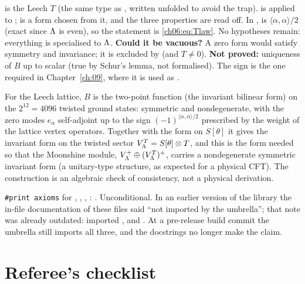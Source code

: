 \begin{dictionary}
 is the Leech $T$ (the same type as , written unfolded to avoid the
 trap).   is  applied to
;  is a form chosen from it, and the three properties are read
off.  In ,  is $\langle\alpha,\alpha\rangle/2$ (exact since
${\Lambda}$ is even), so the statement is \eqref{ch06:eq:Tlaw}.  No hypotheses remain: everything is
specialised to ${\Lambda}$.  \textbf{Could it be vacuous?}  A zero form would satisfy symmetry and
invariance; it is excluded by  (and $T\ne0$).  \textbf{Not proved:}
uniqueness of $B$ up to scalar (true by Schur's lemma, not formalised).  The sign is the one
required in Chapter~\ref{ch:09}, where it is used as .
\end{dictionary}

\begin{physics}
For the Leech lattice, $B$ is the two-point function (the invariant bilinear form) on the $2^{12}=4096$ twisted ground states: symmetric and nondegenerate, with the zero modes $e_\alpha$ self-adjoint up to the sign $(-1)^{\langle\alpha,\alpha\rangle/2}$ prescribed by the weight of the lattice vertex operators. Together with the form on $S[\theta]$ it gives the invariant form on the twisted sector $V_{\Lambda}^T=S[\theta]\otimes T$, and this is the form needed so that the Moonshine module, $V_{\Lambda}^+\oplus(V_{\Lambda}^T)^+$, carries a nondegenerate symmetric invariant form (a unitary-type structure, as expected for a physical CFT). The construction is an algebraic check of consistency, not a physical derivation.
\end{physics}
\begin{status}
\texttt{\#print axioms} for , , ,
: .  Unconditional.  In an earlier version of the library the in-file
documentation of these files said ``not imported by the umbrella''; that note was already outdated:
 imported ,  and
. At a pre-release build commit the umbrella still imports all three, and the docstrings no longer
make the claim.
\end{status}

\section{Referee's checklist}\label{ch06:sec:checklist}

